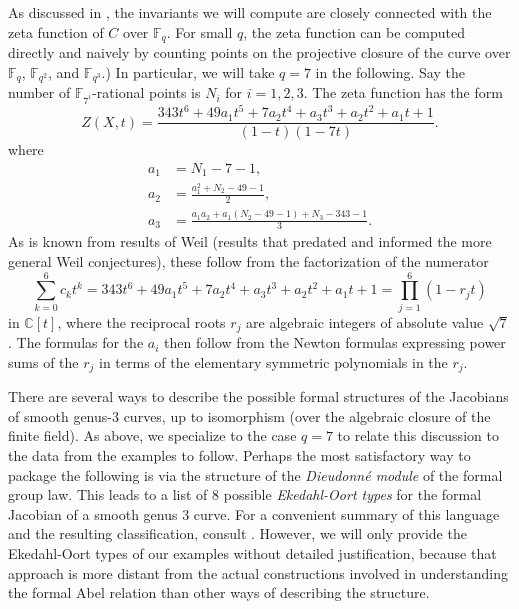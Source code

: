 \documentclass[12pt]{amsart}
\theoremstyle{theorem}
\newcommand{\FF}{\mathbb{F}}
\newcommand{\CC}{\mathbb{C} }
\begin{document}
 As discussed in \cite{AchterHowe}, the invariants we will compute are 
closely connected with the zeta function of $C$ over $\FF_q$.  
For small $q$, the zeta function can be computed directly and naively by counting points on the projective closure
of the curve over $\FF_q$, $\FF_{q^2}$, and $\FF_{q^3}$.)   In particular, we will take $q = 7$ in the following.
Say the number of $\FF_{7^i}$-rational points is $N_i$ for $i = 1,2,3$.
 The zeta function has the form 
$$Z(X,t) = \frac{343 t^6 + 49 a_1 t^5 + 7 a_2 t^4 + a_3 t^3 + a_2 t^2 + a_1 t + 1}{(1 - t)(1 - 7 t)}.$$
where 
\begin{align*}
a_1 &= N_1 - 7 - 1,\\
a_2 &= \frac{a_1^2 + N_2 - 49 - 1}{2},\\
a_3 &= \frac{a_1 a_2 + a_1 (N_2 - 49 - 1) + N_3 - 343 - 1}{3}.
\end{align*}
As is known from results of Weil (results that predated and informed the more general Weil conjectures), 
these follow from the factorization of the numerator
$$\sum_{k = 0}^6 c_k t^k = 343 t^6 + 49 a_1 t^5 + 7 a_2 t^4 + a_3 t^3 + a_2 t^2 + a_1 t + 1 = \prod_{j = 1}^6(1 - r_j t)$$
in $\CC[t]$, where the reciprocal roots $r_j$ are algebraic integers of absolute value $\sqrt{7}$.  
The formulas for the $a_i$ then follow from the Newton formulas expressing power sums of 
the $r_j$ in terms of the elementary symmetric polynomials in the $r_j$.  

There are several ways to describe the possible formal structures of the Jacobians of smooth genus-3
curves, up to isomorphism (over the algebraic closure of the finite field).  As above, we specialize to the case $q = 7$ to 
relate this discussion to the data from the examples to follow.  Perhaps the most satisfactory way
to package the following is via the structure of the \emph{Dieudonn\'e module} of the formal
group law.  This leads to a list of $8$ possible \emph{Ekedahl-Oort types} for the formal Jacobian of a smooth genus 3 curve.
For a convenient summary of this language and the resulting classification, consult \cite{AP}.
 However, we will only provide the Ekedahl-Oort types of our examples without detailed justification,
  because that approach is more distant from the actual
constructions involved in understanding the formal Abel relation than other ways of describing the structure.  
\end{document}
